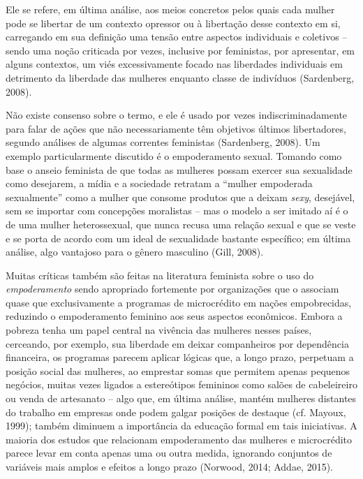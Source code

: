 Ele se refere, em última análise, aos meios concretos pelos quais cada mulher pode se libertar de um contexto opressor ou à libertação desse contexto em si, carregando em sua definição uma tensão entre aspectos individuais e coletivos – sendo uma noção criticada por vezes, inclusive por feministas, por apresentar, em alguns contextos, um viés excessivamente focado nas liberdades individuais em detrimento da liberdade das mulheres enquanto classe de indivíduos (Sardenberg, 2008). 

Não existe consenso sobre o termo, e ele é usado por vezes indiscriminadamente para falar de ações que não necessariamente têm objetivos últimos libertadores, segundo análises de algumas correntes feministas (Sardenberg, 2008). Um exemplo particularmente discutido é o empoderamento sexual. Tomando como base o anseio feminista de que todas as mulheres possam exercer sua sexualidade como desejarem, a mídia e a sociedade retratam a ``mulher empoderada sexualmente'' como a mulher que consome produtos que a deixam \textit{sexy}, desejável, sem se importar com concepções moralistas – mas o modelo a ser imitado aí é o de uma mulher heterossexual, que nunca recusa uma relação sexual e que se veste e se porta de acordo com um ideal de sexualidade bastante específico; em última análise, algo vantajoso para o gênero masculino (Gill, 2008).

Muitas críticas também são feitas na literatura feminista sobre o uso do \textit{empoderamento} sendo apropriado fortemente por organizações que o associam quase que exclusivamente a programas de microcrédito em nações empobrecidas, reduzindo o empoderamento feminino aos seus aspectos econômicos. Embora a pobreza tenha um papel central na vivência das mulheres nesses países, cerceando, por exemplo, sua liberdade em deixar companheiros por dependência financeira, os programas parecem aplicar lógicas que, a longo prazo, perpetuam a posição social das mulheres, ao emprestar somas que permitem apenas pequenos negócios, muitas vezes ligados a estereótipos femininos como salões de cabeleireiro ou venda de artesanato – algo que, em última análise, mantém mulheres distantes do trabalho em empresas onde podem galgar posições de destaque (cf. Mayoux, 1999); também diminuem a importância da educação formal em tais iniciativas. A maioria dos estudos que relacionam empoderamento das mulheres e microcrédito parece levar em conta apenas uma ou outra medida, ignorando conjuntos de variáveis mais amplos e efeitos a longo prazo (Norwood, 2014; Addae, 2015).

